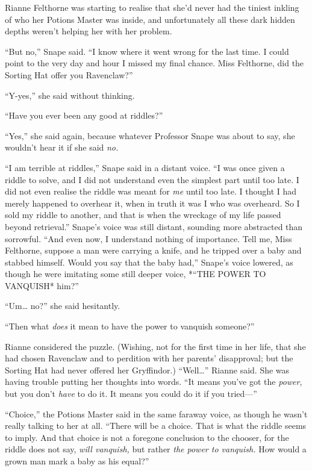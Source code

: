 Rianne Felthorne was starting to realise that she'd never had the
tiniest inkling of who her Potions Master was inside, and unfortunately
all these dark hidden depths weren't helping her with her problem.

``But no,'' Snape said. ``I know where it went wrong for the last time.
I could point to the very day and hour I missed my final chance. Miss
Felthorne, did the Sorting Hat offer you Ravenclaw?''

``Y-yes,'' she said without thinking.

``Have you ever been any good at riddles?''

``Yes,'' she said again, because whatever Professor Snape was about to
say, she wouldn't hear it if she said \emph{no.}

``I am terrible at riddles,'' Snape said in a distant voice. ``I was
once given a riddle to solve, and I did not understand even the simplest
part until too late. I did not even realise the riddle was meant for
\emph{me} until too late. I thought I had merely happened to overhear
it, when in truth it was I who was overheard. So I sold my riddle to
another, and that is when the wreckage of my life passed beyond
retrieval.'' Snape's voice was still distant, sounding more abstracted
than sorrowful. ``And even now, I understand nothing of importance. Tell
me, Miss Felthorne, suppose a man were carrying a knife, and he tripped
over a baby and stabbed himself. Would you say that the baby had,''
Snape's voice lowered, as though he were imitating some still deeper
voice, *``THE POWER TO VANQUISH* him?''

``Um\ldots{} no?'' she said hesitantly.

``Then what \emph{does} it mean to have the power to vanquish someone?''

Rianne considered the puzzle. (Wishing, not for the first time in her
life, that she had chosen Ravenclaw and to perdition with her parents'
disapproval; but the Sorting Hat had never offered her Gryffindor.)
``Well\ldots{}'' Rianne said. She was having trouble putting her
thoughts into words. ``It means you've got the \emph{power}, but you
don't \emph{have} to do it. It means you could do it if you tried---''

``Choice,'' the Potions Master said in the same faraway voice, as though
he wasn't really talking to her at all. ``There will be a choice. That
is what the riddle seems to imply. And that choice is not a foregone
conclusion to the chooser, for the riddle does not say, \emph{will
vanquish,} but rather \emph{the power to vanquish.} How would a grown
man mark a baby as his equal?''

